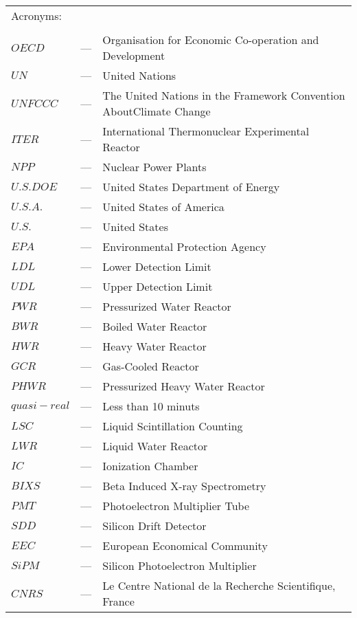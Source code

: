 \begin{longtable}{p{25mm} c p{120mm} }
\multicolumn{3}{l}{Acronyms:}\\
\\
$OECD$ & --- & Organisation for Economic Co-operation and Development\\
$UN$ & --- & United Nations\\
$UNFCCC$ & --- & The United Nations in the Framework Convention About\newline Climate Change\\
$ITER$ & --- & International Thermonuclear Experimental Reactor\\
$NPP$ & --- & Nuclear Power Plants\\
$U.S. DOE$ & --- & United States Department of Energy\\
$U.S.A.$ & --- & United States of America\\
$U.S.$ & --- & United States\\
$EPA$ & --- & Environmental Protection Agency\\
$LDL$ & --- & Lower Detection Limit\\
$UDL$ & --- & Upper Detection Limit\\
$PWR$ & --- & Pressurized Water Reactor\\
$BWR$ & --- & Boiled Water Reactor\\
$HWR$ & --- & Heavy Water Reactor\\
$GCR$ & --- & Gas-Cooled Reactor\\
$PHWR$ & --- & Pressurized Heavy Water Reactor\\
$quasi-real$ & --- & Less than 10 minuts\\
$LSC$ & --- & Liquid Scintillation Counting\\
$LWR$ & --- & Liquid Water Reactor\\
$IC$ & --- & Ionization Chamber\\
$BIXS$ & --- & Beta Induced X-ray Spectrometry\\
$PMT$ & --- & Photoelectron Multiplier Tube\\
$SDD$ & --- & Silicon Drift Detector\\
$EEC$ & --- & European Economical Community\\
$SiPM$ & --- & Silicon Photoelectron Multiplier\\
$CNRS$ & --- & Le Centre National de la Recherche Scientifique, France\\

\end{longtable}

